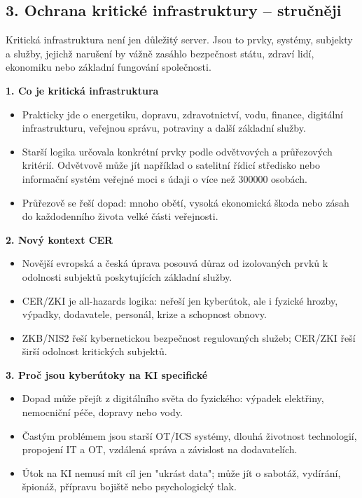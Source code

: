 
\subsection*{3. Ochrana kritické infrastruktury -- stručněji}
Kritická infrastruktura není jen důležitý server. Jsou to prvky, systémy, subjekty a služby, jejichž narušení by vážně zasáhlo bezpečnost státu, zdraví lidí, ekonomiku nebo základní fungování společnosti.

\textbf{1. Co je kritická infrastruktura}
\begin{itemize}
  \item Prakticky jde o energetiku, dopravu, zdravotnictví, vodu, finance, digitální infrastrukturu, veřejnou správu, potraviny a další základní služby.
  \item Starší logika určovala konkrétní prvky podle odvětvových a průřezových kritérií. Odvětvově může jít například o satelitní řídicí středisko nebo informační systém veřejné moci s údaji o více než 300000 osobách.
  \item Průřezově se řeší dopad: mnoho obětí, vysoká ekonomická škoda nebo zásah do každodenního života velké části veřejnosti.
\end{itemize}

\textbf{2. Nový kontext CER}
\begin{itemize}
  \item Novější evropská a česká úprava posouvá důraz od izolovaných prvků k odolnosti subjektů poskytujících základní služby.
  \item CER/ZKI je all-hazards logika: neřeší jen kyberútok, ale i fyzické hrozby, výpadky, dodavatele, personál, krize a schopnost obnovy.
  \item ZKB/NIS2 řeší kybernetickou bezpečnost regulovaných služeb; CER/ZKI řeší širší odolnost kritických subjektů.
\end{itemize}

\textbf{3. Proč jsou kyberútoky na KI specifické}
\begin{itemize}
  \item Dopad může přejít z digitálního světa do fyzického: výpadek elektřiny, nemocniční péče, dopravy nebo vody.
  \item Častým problémem jsou starší OT/ICS systémy, dlouhá životnost technologií, propojení IT a OT, vzdálená správa a závislost na dodavatelích.
  \item Útok na KI nemusí mít cíl jen "ukrást data"; může jít o sabotáž, vydírání, špionáž, přípravu bojiště nebo psychologický tlak.
\end{itemize}

